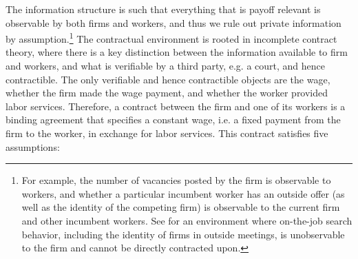 The information structure is such that everything that is payoff relevant is observable by both firms and workers, and thus we rule out private information by assumption.\footnote{
    For example, the number of vacancies posted by the firm is observable to workers, and whether a particular incumbent worker has an outside offer (as well as the identity of the competing firm) is observable to the current firm and other incumbent workers.
    See \citet{Lentz2015} for an environment where on-the-job search behavior, including the identity of firms in outside meetings, is unobservable to the firm and cannot be directly contracted upon.}
The contractual environment is rooted in incomplete contract theory, where there is a key distinction between the information available to firm and workers, and what is verifiable by a third party, e.g. a court, and hence contractible.
The only verifiable and hence contractible objects are the wage, whether the firm made the wage payment, and whether the worker provided labor services.
Therefore, a contract between the firm and one of its workers is a binding agreement that specifies a constant wage, i.e. a fixed payment from the firm to the worker, in exchange for labor services.
This contract satisfies five assumptions:

